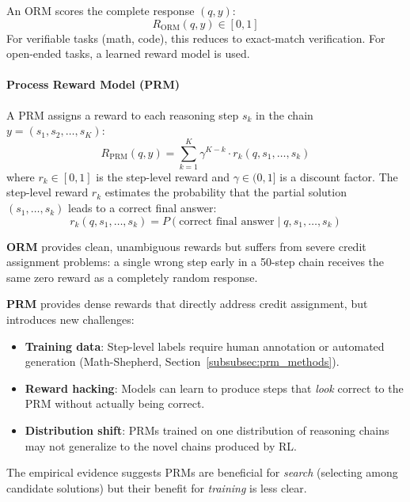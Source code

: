 An ORM scores the complete response $(q, y)$: 
\begin{equation}
    R_{\text{ORM}}(q, y) \in [0, 1]
\end{equation}
 For verifiable tasks (math, code), this reduces to exact-match verification. For open-ended tasks, a learned reward model is used.

\paragraph{Process Reward Model (PRM)}
\label{process-reward-model-prm}

A PRM assigns a reward to each reasoning step $s_k$ in the chain $y = (s_1, s_2, \ldots, s_K)$: 
\begin{equation}
    R_{\text{PRM}}(q, y) = \sum_{k=1}^{K} \gamma^{K-k} \cdot r_k(q, s_1, \ldots, s_k)
\end{equation}
 where $r_k \in [0,1]$ is the step-level reward and $\gamma \in (0,1]$ is a discount factor. The step-level reward $r_k$ estimates the probability that the partial solution $(s_1, \ldots, s_k)$ leads to a correct final answer: 
\begin{equation}
    r_k(q, s_1, \ldots, s_k) = P(\text{correct final answer} \mid q, s_1, \ldots, s_k)
\end{equation}

\begin{intuitionbox}
\textbf{ORM} provides clean, unambiguous rewards but suffers from severe credit assignment problems: a single wrong step early in a 50-step chain receives the same zero reward as a completely random response.

\textbf{PRM} provides dense rewards that directly address credit assignment, but introduces new challenges:

\begin{itemize}
  \item \textbf{Training data}: Step-level labels require human annotation or automated generation (Math-Shepherd, Section~\ref{subsubsec:prm_methods}).
  \item \textbf{Reward hacking}: Models can learn to produce steps that \emph{look} correct to the PRM without actually being correct.
  \item \textbf{Distribution shift}: PRMs trained on one distribution of reasoning chains may not generalize to the novel chains produced by RL.
\end{itemize}

The empirical evidence suggests PRMs are beneficial for \emph{search} (selecting among candidate solutions) but their benefit for \emph{training} is less clear.
\end{intuitionbox}

